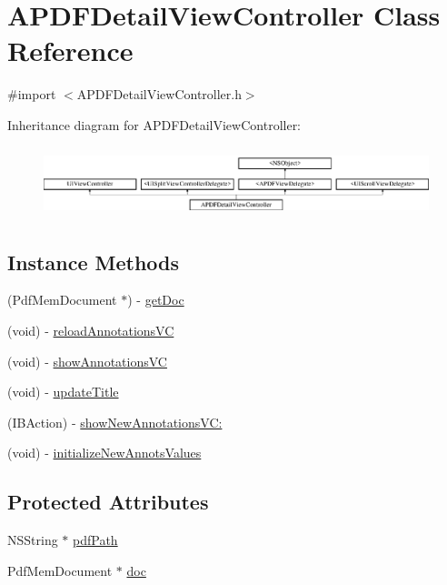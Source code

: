 \hypertarget{interface_a_p_d_f_detail_view_controller}{\section{A\-P\-D\-F\-Detail\-View\-Controller Class Reference}
\label{interface_a_p_d_f_detail_view_controller}
}


{\ttfamily \#import $<$A\-P\-D\-F\-Detail\-View\-Controller.\-h$>$}

Inheritance diagram for A\-P\-D\-F\-Detail\-View\-Controller\-:\begin{figure}[H]
\begin{center}
\leavevmode
\includegraphics[height=2.068965cm]{interface_a_p_d_f_detail_view_controller}
\end{center}
\end{figure}
\subsection*{Instance Methods}
\begin{DoxyCompactItemize}
\item 
(Pdf\-Mem\-Document $\ast$) -\/ \hyperlink{interface_a_p_d_f_detail_view_controller_a7f6a33379c5613faa4926546a7f4c60f}{get\-Doc}
\item 
(void) -\/ \hyperlink{interface_a_p_d_f_detail_view_controller_ababd6cc8d5d3ead343e7fc8303d47bf8}{reload\-Annotations\-V\-C}
\item 
(void) -\/ \hyperlink{interface_a_p_d_f_detail_view_controller_a04c563546f782dee38d50219969c4218}{show\-Annotations\-V\-C}
\item 
(void) -\/ \hyperlink{interface_a_p_d_f_detail_view_controller_a1b741c81ffc718cd084c14fa7718b6ed}{update\-Title}
\item 
(I\-B\-Action) -\/ \hyperlink{interface_a_p_d_f_detail_view_controller_a6a816fd865b647205e60718f7b69b6ce}{show\-New\-Annotations\-V\-C\-:}
\item 
(void) -\/ \hyperlink{interface_a_p_d_f_detail_view_controller_a786dceb0898921a3c8e2af9f70bdc78e}{initialize\-New\-Annots\-Values}
\end{DoxyCompactItemize}
\subsection*{Protected Attributes}
\begin{DoxyCompactItemize}
\item 
N\-S\-String $\ast$ \hyperlink{interface_a_p_d_f_detail_view_controller_adda3bad1f44d9fc5cfac4b94ab75a198}{pdf\-Path}
\item 
Pdf\-Mem\-Document $\ast$ \hyperlink{interface_a_p_d_f_detail_view_controller_ab8d4020661eb57276a4748ab9e39b730}{doc}
\end{DoxyCompactItemize}
